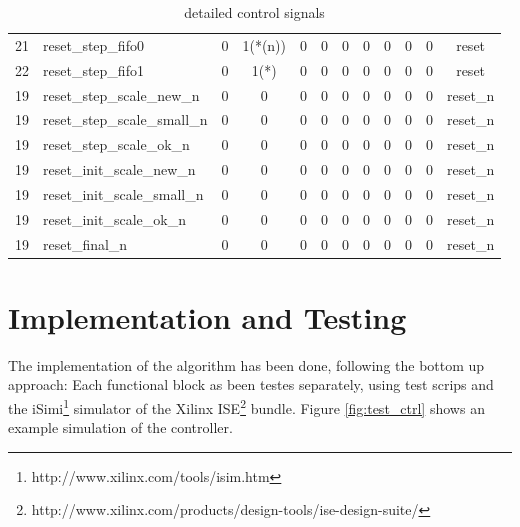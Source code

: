 \documentclass[mscthesis]{usiinfthesis}
\begin{document}
\begin{table}
\begin{center}
\begin{tabular}{|c|l|*{10}{c|}}
    21   & reset\_step\_fifo0          & 0    & 1(*(n))& 0    & 0          & 0      & 0      & 0    & 0    & 0     & reset       \\
    22   & reset\_step\_fifo1          & 0    & 1(*)   & 0    & 0          & 0      & 0      & 0    & 0    & 0     & reset       \\
    19   & reset\_step\_scale\_new\_n  & 0    & 0      & 0    & 0          & 0      & 0      & 0    & 0    & 0     & reset\_n    \\
    19   & reset\_step\_scale\_small\_n& 0    & 0      & 0    & 0          & 0      & 0      & 0    & 0    & 0     & reset\_n    \\
    19   & reset\_step\_scale\_ok\_n   & 0    & 0      & 0    & 0          & 0      & 0      & 0    & 0    & 0     & reset\_n    \\
    19   & reset\_init\_scale\_new\_n  & 0    & 0      & 0    & 0          & 0      & 0      & 0    & 0    & 0     & reset\_n    \\
    19   & reset\_init\_scale\_small\_n& 0    & 0      & 0    & 0          & 0      & 0      & 0    & 0    & 0     & reset\_n    \\
    19   & reset\_init\_scale\_ok\_n   & 0    & 0      & 0    & 0          & 0      & 0      & 0    & 0    & 0     & reset\_n    \\
    19   & reset\_final\_n             & 0    & 0      & 0    & 0          & 0      & 0      & 0    & 0    & 0     & reset\_n    \\
    \hline
    \end{tabular}
    \end{center}
    \caption{detailed control signals}
    \label{tab:ctrl_detailed}
\end{table}

\section{Implementation and Testing}

The implementation of the algorithm has been done, following the bottom up
approach: Each functional block as been testes separately, using test scrips
and the iSimi\footnote{http://www.xilinx.com/tools/isim.htm} simulator of the
Xilinx
ISE\footnote{http://www.xilinx.com/products/design-tools/ise-design-suite/}
bundle. Figure \ref{fig:test_ctrl} shows an example simulation of the
controller.
\end{document}
